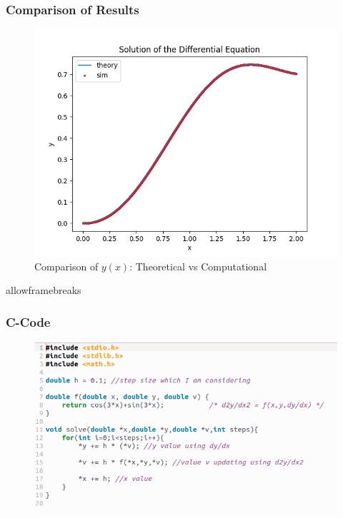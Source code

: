 \documentclass{beamer}
\begin{document}
\begin{frame}
\frametitle{Comparison of Results}
\begin{figure}[h!]
    \centering
    \includegraphics[width=\columnwidth]{figs/fig1.png} %
    \caption{Comparison of $y(x)$: Theoretical vs Computational}
    \label{comparison}
\end{figure}
\end{frame}
\begin{frame}{allowframebreaks}
\frametitle{C-Code}
\begin{figure}[ht]
                        \centering
                        \includegraphics[width=\columnwidth]{figs/fig2.png}
                        \
\end{figure}
\end{frame}
\end{document}
